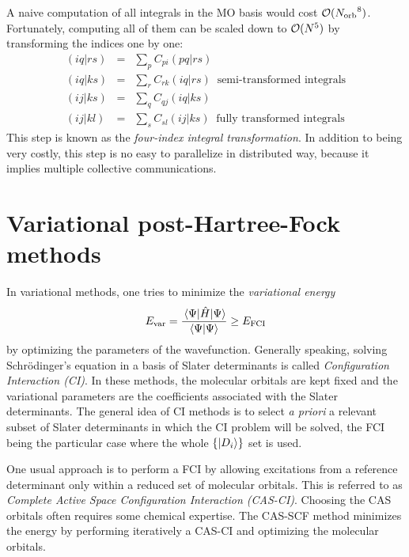 \documentclass[./thesis.tex]{subfiles}
\begin{document}
A naive computation of all integrals in the MO basis would cost ${\cal O}({N_\text{orb}}^8)$. Fortunately, computing all of them can be scaled down to ${\cal O}(N^5)$ by transforming the indices one by one:\cite{Wilson_1987}
\begin{eqnarray}
(iq\vert rs) & = & \sum_{p} C_{pi} (pq|rs) \nonumber \\ 
(iq\vert ks) & = & \sum_{r} C_{rk} (iq|rs) \;\; \text{semi-transformed integrals} \\
(ij\vert ks) & = & \sum_{q} C_{qj} (iq|ks) \nonumber \\ 
(ij\vert kl) & = & \sum_{s} C_{sl} (ij|ks)  \;\; \text{fully transformed integrals}
\end{eqnarray}
This step is known as the \emph{four-index integral transformation}.  
In addition to being very costly, this step is no easy to parallelize in
distributed way, because it implies multiple collective communications.\cite{Rajbhandari_2017,Limaye_1994,Fletcher_1999,Covick_1990}



\section{Variational post-Hartree-Fock methods}

In variational methods, one tries to minimize the \emph{variational energy}
\begin{equation}
E_\text{var} = \frac{\mel{\Psi}{\hat{H}}{\Psi}}{\braket{\Psi}{\Psi}} \ge E_\text{FCI}
\label{eq:evar}
\end{equation}
by optimizing the parameters of the wavefunction.
Generally speaking, solving Schrö\-dinger's equation in a basis of Slater determinants is called \emph{Configuration Interaction (CI)}.
In these methods, the molecular orbitals are kept fixed and the variational parameters are the coefficients associated with the Slater determinants.
The general idea of CI methods is to select \textit{a priori} a relevant subset
of Slater determinants in which the CI problem will be solved, the FCI being
the particular case where the whole $\{\ket {D_i} \}$ set is used.

One usual approach is to perform a FCI by allowing excitations from a reference determinant only within a reduced set of molecular orbitals. This is referred to as \emph{Complete Active Space Configuration Interaction (CAS-CI)}. Choosing the CAS orbitals often requires some chemical expertise. The CAS-SCF method minimizes the energy by performing iteratively a CAS-CI and optimizing the molecular orbitals.
\end{document}
